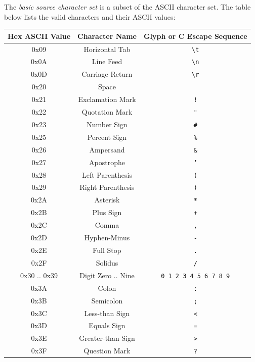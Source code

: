 
\p The \textit{basic source character set} is a subset of the ASCII character set.
The table below lists the valid characters and their ASCII values:

\begin{center}
  \begin{tabular}{|| c | c | c ||}
    \hline
    Hex ASCII Value & Character Name & Glyph or C Escape Sequence \\
    \hline
    0x09 & Horizontal Tab & \texttt{\textbackslash t} \\
    0x0A & Line Feed & \texttt{\textbackslash n} \\
    0x0D & Carriage Return & \texttt{\textbackslash r} \\
    0x20 & Space & \\
    0x21 & Exclamation Mark & \texttt{!}\\
    0x22 & Quotation Mark & \texttt{"}\\
    0x23 & Number Sign & \texttt{\#}\\
    0x25 & Percent Sign & \texttt{\%}\\
    0x26 & Ampersand & \texttt{\&}\\
    0x27 & Apostrophe & \texttt{'}\\
    0x28 & Left Parenthesis & \texttt{(}\\
    0x29 & Right Parenthesis & \texttt{)}\\
    0x2A & Asterisk & \texttt{*}\\
    0x2B & Plus Sign & \texttt{+}\\
    0x2C & Comma & \texttt{,}\\
    0x2D & Hyphen-Minus & \texttt{-}\\
    0x2E & Full Stop & \texttt{.}\\
    0x2F & Solidus & \texttt{/}\\
    0x30 .. 0x39 & Digit Zero .. Nine & \texttt{0 1 2 3 4 5 6 7 8 9}\\
    0x3A & Colon & \texttt{:}\\
    0x3B & Semicolon & \texttt{;}\\
    0x3C & Less-than Sign & \texttt{<}\\
    0x3D & Equals Sign & \texttt{=}\\
    0x3E & Greater-than Sign & \texttt{>}\\
    0x3F & Question Mark & \texttt{?}\\

\end{tabular}
\end{center}

